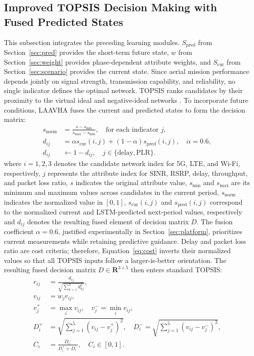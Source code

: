 \documentclass[final,3p,times,twocolumn]{elsarticle}
\begin{document}
\subsection{Improved TOPSIS Decision Making with Fused Predicted States}\label{sec:topsis}

This subsection integrates the preceding learning modules. $S_{\mathrm{pred}}$ from Section~\ref{sec:pred} provides the short-term future state, $w$ from Section~\ref{sec:weight} provides phase-dependent attribute weights, and $S_{\mathrm{cur}}$ from Section~\ref{sec:scenario} provides the current state. Since aerial mission performance depends jointly on signal strength, transmission capability, and reliability, no single indicator defines the optimal network. TOPSIS ranks candidates by their proximity to the virtual ideal and negative-ideal networks \cite{ref8,ref9}. To incorporate future conditions, LAAVHA fuses the current and predicted states to form the decision matrix:
\begin{align}
s_{\mathrm{norm}} &= \frac{s-s_{\min}}{s_{\max}-s_{\min}},\quad \text{for each indicator }j, \label{eq:norm}\\
d_{ij} &= \alpha s_{\mathrm{cur}}(i,j)+(1-\alpha)s_{\mathrm{pred}}(i,j),\quad \alpha=0.6, \label{eq:fuse}\\
d_{ij} &\leftarrow 1-d_{ij},\quad j\in\{\mathrm{delay},\mathrm{PLR}\}. \label{eq:cost}
\end{align}
where $i=1,2,3$ denotes the candidate network index for 5G, LTE, and Wi-Fi, respectively, $j$ represents the attribute index for SINR, RSRP, delay, throughput, and packet loss ratio, $s$ indicates the original attribute value, $s_{\min}$ and $s_{\max}$ are its minimum and maximum values across candidates in the current period, $s_{\mathrm{norm}}$ indicates the normalized value in $[0,1]$, $s_{\mathrm{cur}}(i,j)$ and $s_{\mathrm{pred}}(i,j)$ correspond to the normalized current and LSTM-predicted next-period values, respectively and $d_{ij}$ denotes the resulting fused element of decision matrix $D$. The fusion coefficient $\alpha=0.6$, justified experimentally in Section~\ref{sec:platform}, prioritizes current measurements while retaining predictive guidance. Delay and packet loss ratio are cost criteria; therefore, Equation~\eqref{eq:cost} inverts their normalized values so that all TOPSIS inputs follow a larger-is-better orientation. The resulting fused decision matrix $D\in\mathbf{R}^{3\times5}$ then enters standard TOPSIS:
\begin{align}
r_{ij} &= \frac{d_{ij}}{\sqrt{\sum_{k=1}^{3}d_{kj}^{2}}}, \label{eq:topsis1}\\
v_{ij} &= w_j r_{ij}, \label{eq:topsis2}\\
v_j^+ &= \max_i v_{ij},\quad v_j^-=\min_i v_{ij}, \label{eq:topsis3}\\
D_i^+ &= \sqrt{\sum_{j=1}^{5}(v_{ij}-v_j^+)^2},\quad
D_i^-=\sqrt{\sum_{j=1}^{5}(v_{ij}-v_j^-)^2}, \label{eq:topsis4}\\
C_i &= \frac{D_i^-}{D_i^+ + D_i^-},\quad C_i\in[0,1]. \label{eq:topsis5}
\end{align}
\end{document}
